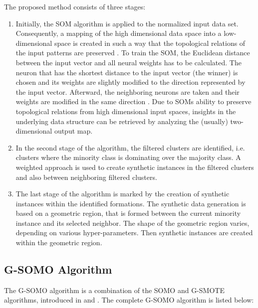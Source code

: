 \documentclass[parskip=full]{scrartcl}
\begin{document}
The proposed method consists of three stages:

\begin{enumerate}

	\item Initially, the SOM algorithm is applied to the normalized input data set. Consequently, a mapping of the high dimensional data space into a low-dimensional space is created in such a way that the topological relations of the input patterns are preserved \cite{Kker2007}. To train the SOM, the Euclidean distance between the input vector and all neural weights has to be calculated. The neuron that has the shortest distance to the input vector (the winner) is chosen and its weights are slightly modified to the direction represented by the input vector. Afterward, the neighboring neurons are taken and their weights are modified in the same direction \cite{Brocki2007}. Due to SOMs ability to preserve topological
	relations from high dimensional input spaces, insights in the underlying data structure can be retrieved by analyzing the (usually) two-dimensional output map.

	\item In the second stage of the algorithm, the filtered clusters are identified, i.e. clusters where the minority class is dominating over the majority class. A weighted approach is used to create synthetic instances in the filtered clusters and also between neighboring filtered clusters.

	\item The last stage of the algorithm is marked by the creation of synthetic instances within the identified formations. The synthetic data generation is based on a geometric region, that is formed between the current minority instance and its selected neighbor. The shape of the geometric region varies, depending on various hyper-parameters. Then synthetic instances are created within the geometric region.

\end{enumerate}

\subsection{G-SOMO Algorithm}

The G-SOMO algorithm is a combination of the SOMO and G-SMOTE algorithms, introduced in \cite{Douzas2017} and \cite{Douzas2019}. The complete G-SOMO algorithm is listed below:
\end{document}
